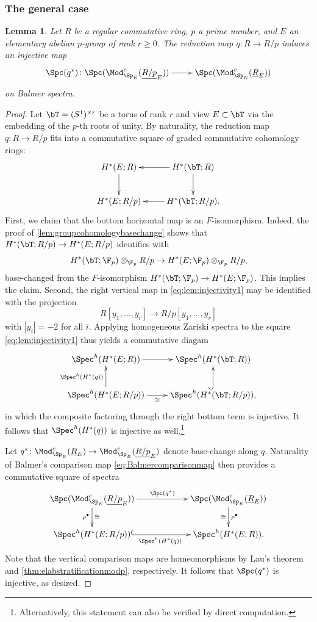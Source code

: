 \documentclass{amsart}%
\numberwithin{equation}{section}%
\newtheorem{Lem}[subsection]{Lemma}
\theoremstyle{remark}
\begin{document}
\subsubsection*{The general case}

\begin{Lem}\label{lem:injectivity}
Let $R$ be a regular commutative ring, $p$ a prime number, and $E$ an elementary abelian $p$-group of rank $r \ge 0$. The reduction map $q\colon R \to R/p$ induces an injective map 
\[
\xymatrix{\Spc(q^*)\colon \Spc(\Mod_{\Sp_{E}}^c(\underline{R/p}_E)) \ar[r] & \Spc(\Mod_{\Sp_{E}}^c(\underline{R}_E))}
\]
on Balmer spectra.
\end{Lem}
\begin{proof}
Let $\bT = (S^{1})^{\times r}$ be a torus of rank $r$ and view $E \subset \bT$ via the embedding of the $p$-th roots of unity. By naturality, the reduction map $q\colon R\to R/p$ fits into a commutative square of graded commutative cohomology rings:
\begin{equation}\label{eq:lem:injectivity1}
\vcenter{
\xymatrix{H^*(E;R) \ar[d] & H^*(\bT;R) \ar[l] \ar[d] \\
H^*(E;R/p) & H^*(\bT;R/p). \ar[l] }
}
\end{equation}
First, we claim that the bottom horizontal map is an $F$-isomorphism. Indeed, the proof of \cref{lem:groupcohomologybasechange} shows that $H^*(\bT;R/p) \to H^*(E;R/p)$ identifies with
\[
H^*(\bT;\F_p) \otimes_{\F_p} R/p   \to H^*(E;\F_p) \otimes_{\F_p} R/p,
\]
base-changed from the $F$-isomorphism $H^*(\bT;\F_p) \to H^*(E;\F_p)$. This implies the claim. Second, the right vertical map in \eqref{eq:lem:injectivity1} may be identified with the projection
\[
R[y_1,\ldots,y_r] \to R/p[y_1,\ldots,y_r]
\]
with $|y_i| = -2$ for all $i$. Applying homogeneous Zariski spectra to the square \eqref{eq:lem:injectivity1} thus yields a commutative diagam
\begin{equation}\label{eq:lem:injectivity2}
    \xymatrix{\Spec^h(H^*(E;R)) \ar[r] & \Spec^h(H^*(\bT;R)) \\
    \Spec^h(H^*(E;R/p)) \ar[r]_-{\cong} \ar[u]^-{\Spec^h(H^*(q))} & \Spec^h(H^*(\bT;R/p)), \ar@{^{(}->}[u]}
\end{equation}
in which the composite factoring through the right bottom term is injective. It follows that $\Spec^h(H^*(q))$ is injective as well.\footnote{Alternatively, this statement can also be verified by direct computation.}

Let $q^*\colon \Mod_{\Sp_{E}}^c(\underline{R}_E) \to \Mod_{\Sp_{E}}^c(\underline{R/p}_E)$ denote base-change along $q$. Naturality of Balmer's comparison map \eqref{eq:Balmercomparisonmap} then provides a commutative square of spectra
\[
\xymatrixcolsep{5pc}{
\xymatrix{\Spc(\Mod_{\Sp_{E}}^c(\underline{R/p}_E)) \ar[r]^-{\Spc(q^*)} \ar[d]_{\rho^{\bullet}}^{\cong} & \Spc(\Mod_{\Sp_{E}}^c(\underline{R}_E)) \ar[d]_{\cong}^{\rho^{\bullet}} \\
\Spec^h(H^*(E;R/p)) \ar@{^{(}->}[r]_{\Spec^h(H^*(q))} & \Spec^h(H^*(E;R)).}}
\]
Note that the vertical comparison maps are homeomorphisms by Lau's theorem and \cref{thm:elabstratificationmodp}, respectively. It follows that $\Spc(q^*)$ is injective, as desired.
\end{proof}
\end{document}
